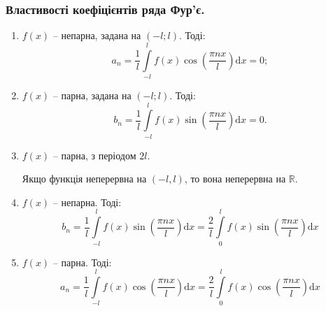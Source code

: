 \documentclass[a4paper]{scrartcl}
\theoremstyle{definition}
\theoremstyle{remark}
\theoremstyle{definition}
\theoremstyle{definition}
\begin{document}
\subsubsection*{Властивості коефіцієнтів ряда Фур'є.}
\begin{enumerate}
  \item $f(x)$ -- непарна, задана на $(-l; l)$. Тоді:
  $$
  a_n = \frac{1}{l}  \int\limits_{-l}^{ l}{
  f(x) \cos{( \frac{\pi n x}{l} )} \mathrm{d} x
  } = 0 ;
  $$
  \item $f(x)$ -- парна, задана на $(-l; l)$. Тоді:
  $$
  b_n = \frac{1}{l}  \int\limits_{-l}^{ l}{
  f(x) \sin{( \frac{\pi n x}{l} ) } \mathrm{d} x
  }  = 0.
  $$
  \item $f(x)$ -- парна, з періодом $2l$. \par
  Якщо функція неперервна на $(-l, l)$, то вона неперервна на $\mathbb{R}$.
  \item $f(x)$ -- непарна. Тоді:
  $$
  b_n = \frac{1}{l}  \int\limits_{-l}^{ l}{
  f(x) \sin{( \frac{\pi n x}{l} ) } \mathrm{d} x
  }  = \frac{2}{l}  \int\limits_{0}^{ l}{
  f(x) \sin{( \frac{\pi n x}{l} ) } \mathrm{d} x
  } $$
  \item $f(x)$ -- парна. Тоді:
  $$
  a_n = \frac{1}{l}  \int\limits_{-l}^{ l}{
  f(x) \cos{( \frac{\pi n x}{l} ) } \mathrm{d} x
  }  = \frac{2}{l}  \int\limits_{0}^{ l}{
  f(x) \cos{( \frac{\pi n x}{l} ) } \mathrm{d} x
  }
  $$
\end{enumerate}
\end{document}

